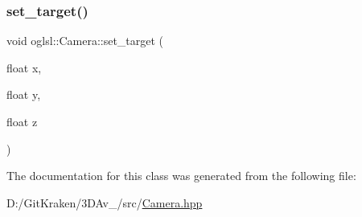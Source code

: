 \mbox{\label{classoglsl_1_1_camera_aacc8dff16915674550dc6d6455565c1f}} 
\subsubsection{\texorpdfstring{set\+\_\+target()}{set\_target()}}
{\footnotesize\ttfamily void oglsl\+::\+Camera\+::set\+\_\+target (\begin{DoxyParamCaption}\item[{float}]{x,  }\item[{float}]{y,  }\item[{float}]{z }\end{DoxyParamCaption})\hspace{0.3cm}{\ttfamily [inline]}}



The documentation for this class was generated from the following file\+:\begin{DoxyCompactItemize}
\item 
D\+:/\+Git\+Kraken/3\+D\+Av\+\_/src/\mbox{\hyperlink{_camera_8hpp}{Camera.\+hpp}}\end{DoxyCompactItemize}
